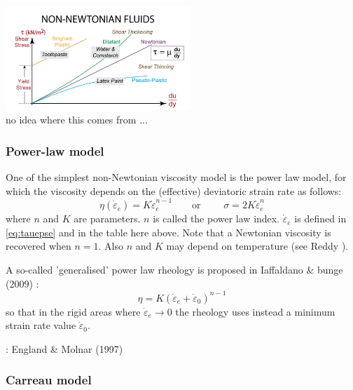 \begin{center}
\includegraphics[width=7cm]{images/rheology/nnf}\\
{\captionfont no idea where this comes from ...}
\end{center}

\subsubsection{Power-law model \label{ss:powerlaw}} 

One of the simplest non-Newtonian viscosity model is the power law model, 
for which the viscosity depends on the (effective) deviatoric strain rate as follows:
\begin{equation}
\eta(\dot{\varepsilon}_e) = K \dot{\varepsilon}_{e}^{n-1}
\qquad \text{or } \qquad
\sigma = 2 K \dot{\varepsilon}_e ^n 
\end{equation}
where $n$ and $K$ are parameters. $n$ is called the power law index. $\dot{\varepsilon}_e$ 
is defined in  \eqref{eq:tauepse} and in the table here above. 
Note that a Newtonian viscosity is recovered when $n=1$. Also $n$ and $K$ may depend on temperature
(see Reddy  \cite[p339]{reddybook2}).

A so-called 'generalised' power law rheology is proposed in Iaffaldano \& bunge (2009) \cite{iabu09}:
\begin{equation}
\eta = K (\dot{\varepsilon}_{e}+\dot{\varepsilon}_0)^{n-1}
\end{equation}
so that in the rigid areas where $\dot{\varepsilon}_e \rightarrow 0$ the rheology 
uses instead a minimum strain rate value $\dot{\varepsilon}_0$.

\Literature: England \& Molnar (1997) \cite{enmo97}

\subsubsection{Carreau model}

